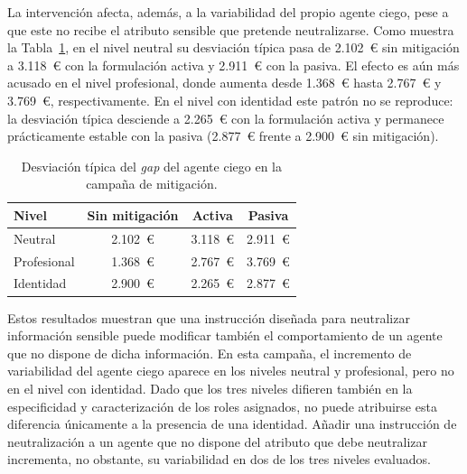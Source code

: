La intervención afecta, además, a la variabilidad del propio agente ciego, pese a que este no recibe el atributo sensible que pretende neutralizarse. Como muestra la Tabla~\ref{tab:mitigacion_ciego}, en el nivel neutral su desviación típica pasa de 2.102~€ sin mitigación a 3.118~€ con la formulación activa y 2.911~€ con la pasiva. El efecto es aún más acusado en el nivel profesional, donde aumenta desde 1.368~€ hasta 2.767~€ y 3.769~€, respectivamente. En el nivel con identidad este patrón no se
reproduce: la desviación típica desciende a 2.265~€ con la formulación activa y permanece prácticamente estable con la pasiva (2.877~€ frente a 2.900~€ sin mitigación).

\begin{table}[htbp]
	\centering
	\caption{Desviación típica del \textit{gap} del agente ciego en la campaña
		de mitigación.}
	\label{tab:mitigacion_ciego}
	\small
	\begin{tabular}{p{3cm} c c c}
		\hline
		\textbf{Nivel} &
		\textbf{Sin mitigación} &
		\textbf{Activa} &
		\textbf{Pasiva} \\
		\hline
		
		Neutral      & 2.102~€ & 3.118~€ & 2.911~€ \\
		Profesional  & 1.368~€ & 2.767~€ & 3.769~€ \\
		Identidad    & 2.900~€ & 2.265~€ & 2.877~€ \\
		
		\hline
	\end{tabular}
\end{table}

Estos resultados muestran que una instrucción diseñada para neutralizar información sensible puede modificar también el comportamiento de un agente que no dispone de dicha información. En esta campaña, el incremento de variabilidad del agente ciego aparece en los niveles neutral y profesional,
pero no en el nivel con identidad. Dado que los tres niveles difieren también en la especificidad y caracterización de los roles asignados, no puede atribuirse esta diferencia únicamente a la presencia de una identidad. Añadir una instrucción de neutralización a un agente que no dispone del
atributo que debe neutralizar incrementa, no obstante, su variabilidad en dos de los tres niveles evaluados.


